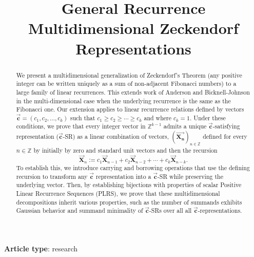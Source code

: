 \documentclass[]{interact}
\newcommand{\Z}{{\mathbb Z}}  %
\newcommand{\vtr}[1]{\vec{\mathbf{#1}}}
\theoremstyle{plain}
\numberwithin{equation}{section} %
\numberwithin{table}{section} %
\numberwithin{figure}{section}
\begin{document}

\title{General Recurrence Multidimensional Zeckendorf Representations}

\author{
}

\maketitle

{\bf Article type}: research 

\bigskip

\begin{abstract}
    We present a multidimensional generalization of Zeckendorf's Theorem (any positive integer can be written uniquely as a sum of non-adjacent Fibonacci numbers) to a large family of linear recurrences. This extends work of Anderson and Bicknell-Johnson in the multi-dimensional case when the underlying recurrence is the same as the Fibonacci one. Our extension applies to linear recurrence relations defined by vectors $\vtr{c} = (c_1, c_2, \ldots, c_k)$ such that $c_1\geq c_2\geq\cdots \geq c_k$ and where $c_k = 1$. Under these conditions, we prove that every integer vector in $\mathbb{Z}^{k-1}$ admits a unique $\vtr{c}$-satisfying representation ($\vtr{c}$-SR) as a linear combination of vectors, $(\vtr{X_n})_{n\in \Z}$ defined for every $n\in \mathbb{Z}$ by initially by zero and standard unit vectors and then the recursion $$\vtr{X}_{n} := c_1\vtr{X}_{n -1} + c_2\vtr{X}_{n - 2} + \cdots + c_k\vtr{X}_{n-k}.$$
    To establish this, we introduce carrying and borrowing operations that use the defining recursion to transform any $\vtr{c}$ representation into a $\vtr{c}$-SR while preserving the underlying vector. Then, by establishing bijections with properties of scalar Positive Linear Recurrence Sequences (PLRS), we prove that these multidimensional decompositions inherit various properties, such as the number of summands exhibits Gaussian behavior and summand minimality of $\vtr{c}$-SRs over all all $\vtr{c}$-representations.
\end{abstract}
\end{document}
